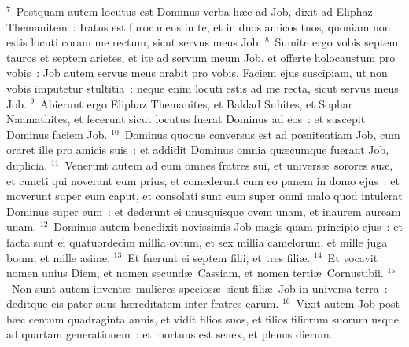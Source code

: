 ${}^{7}$~Postquam autem locutus est Dominus verba h\ae c ad Job, dixit ad Eliphaz Themanitem~: Iratus est furor meus in te, et in duos amicos tuos, quoniam non estis locuti coram me rectum, sicut servus meus Job.
${}^{8}$~Sumite ergo vobis septem tauros et septem arietes, et ite ad servum meum Job, et offerte holocaustum pro vobis~: Job autem servus meus orabit pro vobis. Faciem ejus suscipiam, ut non vobis imputetur stultitia~: neque enim locuti estis ad me recta, sicut servus meus Job.
${}^{9}$~Abierunt ergo Eliphaz Themanites, et Baldad Suhites, et Sophar Naamathites, et fecerunt sicut locutus fuerat Dominus ad eos~: et suscepit Dominus faciem Job.
${}^{10}$~Dominus quoque conversus est ad pœnitentiam Job, cum oraret ille pro amicis suis~: et addidit Dominus omnia qu\ae cumque fuerant Job, duplicia.
${}^{11}$~Venerunt autem ad eum omnes fratres sui, et univers\ae\ sorores su\ae , et cuncti qui noverant eum prius, et comederunt cum eo panem in domo ejus~: et moverunt super eum caput, et consolati sunt eum super omni malo quod intulerat Dominus super eum~: et dederunt ei unusquisque ovem unam, et inaurem auream unam.
${}^{12}$~Dominus autem benedixit novissimis Job magis quam principio ejus~: et facta sunt ei quatuordecim millia ovium, et sex millia camelorum, et mille juga boum, et mille asin\ae .
${}^{13}$~Et fuerunt ei septem filii, et tres fili\ae .
${}^{14}$~Et vocavit nomen unius Diem, et nomen secund\ae\ Cassiam, et nomen terti\ae\ Cornustibii.
${}^{15}$~Non sunt autem invent\ae\ mulieres specios\ae\ sicut fili\ae\ Job in universa terra~: deditque eis pater suus h\ae reditatem inter fratres earum.
${}^{16}$~Vixit autem Job post h\ae c centum quadraginta annis, et vidit filios suos, et filios filiorum suorum usque ad quartam generationem~: et mortuus est senex, et plenus dierum.
